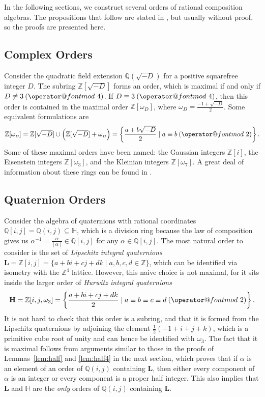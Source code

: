 \documentclass[10pt]{amsart}
\makeatletter
\newcommand{\Q}{\mathbb{Q}}
\newcommand{\Z}{\mathbb{Z}}
\renewcommand{\H}{\mathbb{H}}
\renewcommand{\L}{\mathbf{L}}
\newcommand{\HH}{\mathbf{H}}
\newcommand{\omd}{\omega_{\scriptscriptstyle D}}
\renewcommand{\bar}{\overline}
\newcommand{\norm}[1]{\left[#1\right]}
\DeclareRobustCommand{\pmod}{\@pmods}
\def\@pmods#1{\mkern4mu({\operator@font mod}\mkern 6mu#1)}
\makeatother
\begin{document}
In the following sections, we construct several orders of rational composition algebras.  The propositions that follow are stated in \cite{Co03}, but usually without proof, so the proofs are presented here.

\subsection*{Complex Orders}
Consider the quadratic field extension $\Q(\sqrt{-D})$ for a positive squarefree integer $D$.  The subring $\Z[\sqrt{-D}]$ forms an order, which is maximal if and only if $D \not \equiv 3 \pmod{4}$.  If $D \equiv 3 \pmod{4}$, then this order is contained in the maximal order $\Z[\omd]$, where $\omd = \frac{-1 + \sqrt{-D}}{2}$.  Some equivalent formulations are
$$
\Z[\omd] = \Z[\sqrt{-D}] \cup \left( \Z[\sqrt{-D}] + \omd \right) = \left\{\frac{a + b\sqrt{-D}}{2} \mid a \equiv b \pmod{2}\right\}.
$$
Some of these maximal orders have been named: the Gaussian integers $\Z[i]$, the Eisenstein integers $\Z[\omega_3]$, and the Kleinian integers $\Z[\omega_7]$.  A great deal of information about these rings can be found in \cite{Co62}.

\subsection*{Quaternion Orders}
Consider the algebra of quaternions with rational coordinates $\Q[i,j] = \Q(i,j) \subseteq \H$, which is a division ring because the law of composition gives us $\alpha^{-1} = \frac{\bar{\alpha}}{\norm{\alpha}} \in \Q[i,j]$ for any $\alpha \in \Q[i,j]$.  The most natural order to consider is the set of \emph{Lipschitz integral quaternions} $\L = \Z[i,j] = \{a + bi + cj + dk \mid a,b,c,d \in \Z\}$, which can be identified via isometry with the $\Z^4$ lattice.  However, this naive choice is not maximal, for it sits inside the larger order of \emph{Hurwitz integral quaternions}
$$
\HH = \Z[i,j,\omega_3] = \left\{\frac{a + bi + cj + dk}{2} \mid a \equiv b \equiv c \equiv d \pmod{2}\right\}.
$$ It is not hard to check that this order is a subring, and that it is formed from the Lipschitz quaternions by adjoining the element $\frac12(-1 + i + j + k)$, which is a primitive cube root of unity and can hence be identified with $\omega_3$.  The fact that it is maximal follows from arguments similar to those in the proofs of Lemmas~\ref{lem:half} and \ref{lem:half4} in the next section, which proves that if $\alpha$ is an element of an order of $\Q(i,j)$ containing $\L$, then either every component of $\alpha$ is an integer or every component is a proper half integer.  This also implies that $\L$ and $\H$ are the \emph{only} orders of $\Q(i,j)$ containing $\L$.
\end{document}

